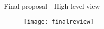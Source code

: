\begin{frame}{Final proposal - High level view}

  \begin{figure}
    \centering
    \texttt{[image: finalreview]}
  \end{figure}

\end{frame}